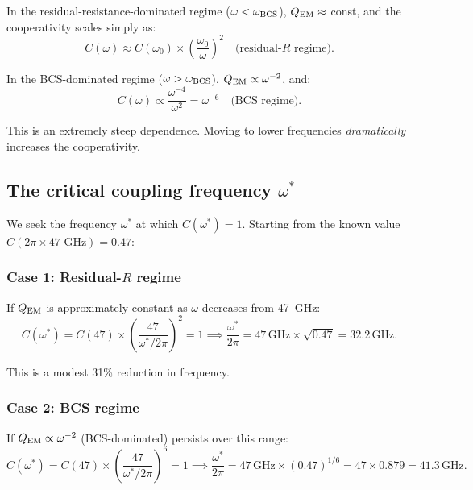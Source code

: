\documentclass[11pt]{article}
\newcommand{\QEM}{Q_{\rm EM}}
\begin{document}
In the residual-resistance-dominated regime ($\omega < \omega_{\rm BCS}$),
$\QEM \approx$ const, and the cooperativity scales simply as:
\begin{equation}
\boxed{
C(\omega) \approx C(\omega_0)\times\left(\frac{\omega_0}{\omega}\right)^2
\quad \text{(residual-$R$ regime)}.
}
\label{eq:C-omega-scaling}
\end{equation}

In the BCS-dominated regime ($\omega > \omega_{\rm BCS}$), $\QEM \propto
\omega^{-2}$, and:
\begin{equation}
C(\omega) \propto \frac{\omega^{-4}}{\omega^2} = \omega^{-6}
\quad \text{(BCS regime)}.
\label{eq:C-BCS-regime}
\end{equation}

This is an extremely steep dependence. Moving to lower frequencies
\emph{dramatically} increases the cooperativity.

\subsection{The critical coupling frequency $\omega^*$}

We seek the frequency $\omega^*$ at which $C(\omega^*) = 1$. Starting from
the known value $C(2\pi\times 47\text{~GHz}) = 0.47$:

\subsubsection{Case 1: Residual-$R$ regime}

If $\QEM$ is approximately constant as $\omega$ decreases from 47~GHz:
\begin{equation}
C(\omega^*) = C(47)\times\left(\frac{47}{\omega^*/2\pi}\right)^2 = 1
\implies \frac{\omega^*}{2\pi} = 47\,\text{GHz}\times\sqrt{0.47}
= 32.2\,\text{GHz}.
\label{eq:omega-star-residual}
\end{equation}

This is a modest 31\% reduction in frequency.

\subsubsection{Case 2: BCS regime}

If $\QEM \propto \omega^{-2}$ (BCS-dominated) persists over this range:
\begin{equation}
C(\omega^*) = C(47)\times\left(\frac{47}{\omega^*/2\pi}\right)^6 = 1
\implies \frac{\omega^*}{2\pi} = 47\,\text{GHz}\times(0.47)^{1/6}
= 47\times 0.879 = 41.3\,\text{GHz}.
\label{eq:omega-star-BCS}
\end{equation}
\end{document}
